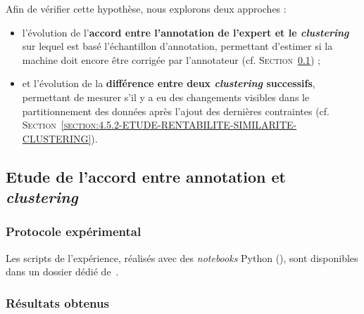 	Afin de vérifier cette hypothèse, nous explorons deux approches :
	\begin{itemize}
		\item l'évolution de l'\textbf{accord entre l'annotation de l'expert et le \textit{clustering}} sur lequel est basé l'échantillon d'annotation, permettant d'estimer si la machine doit encore être corrigée par l'annotateur  (cf. \textsc{Section~\ref{section:4.5.1-ETUDE-RENTABILITE-ACCORD-ANNOTATION-CLUSTERING}}) ;
		\item et l'évolution de la \textbf{différence entre deux \textit{clustering} successifs}, permettant de mesurer s'il y a eu des changements visibles dans le partitionnement des données après l'ajout des dernières contraintes (cf. \textsc{Section~\ref{section:4.5.2-ETUDE-RENTABILITE-SIMILARITE-CLUSTERING}}).
	\end{itemize}
	
	
	\subsection{Etude de l'accord entre annotation et \textit{clustering}}
	\label{section:4.5.1-ETUDE-RENTABILITE-ACCORD-ANNOTATION-CLUSTERING}
		
	
		\subsubsection{Protocole expérimental}
			
			
			\begin{leftBarInformation}
				Les scripts de l'expérience, réalisés avec des \textit{notebooks} Python (\cite{van-rossum-drake:2009:python-reference-manual}), sont disponibles dans un dossier dédié de~\cite{schild:2021:cognitivefactory-interactiveclusteringcomparativestudy}.
			\end{leftBarInformation}

		\subsubsection{Résultats obtenus}
		
